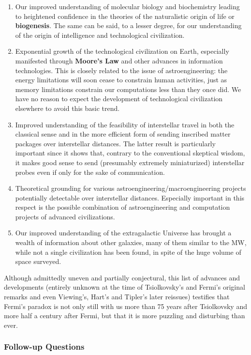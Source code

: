 \documentclass[a4paper,10pt]{article}
\begin{document}
\begin{enumerate}
    \item Our improved understanding of molecular biology and biochemistry leading to heightened confidence in the theories of the naturalistic origin of life or \textbf{biogenesis}. The same can be said, to a lesser degree, for our understanding of the origin of intelligence and technological civilization.
    \item Exponential growth of the technological civilization on Earth, especially manifested through \textbf{Moore's Law} and other advances in information technologies. This is closely related to the issue of astroengineering: the energy limitations will soon cease to constrain human activities, just as memory limitations constrain our computations less than they once did. We have no reason to expect the development of technological civilization elsewhere to avoid this basic trend.
    \item Improved understanding of the feasibility of interstellar travel in both the classical sense and in the more efficient form of sending inscribed matter packages over interstellar distances. The latter result is particularly important since it shows that, contrary to the conventional skeptical wisdom, it makes good sense to send (presumably extremely miniaturized) interstellar probes even if only for the sake of communication.
    \item Theoretical grounding for various astroengineering/macroengineering projects potentially detectable over interstellar distances. Especially important in this respect is the possible combination of astroengineering and computation projects of advanced civilizations.
    \item Our improved understanding of the extragalactic Universe has brought a wealth of information about other galaxies, many of them similar to the MW, while not a single civilization  has been found, in spite of the huge volume of space surveyed.
\end{enumerate}

{\noindent}Although admittedly uneven and partially conjectural, this list of advances and developments (entirely unknown at the time of Tsiolkovsky's and Fermi's original remarks and even Viewing's, Hart's and Tipler's later reissues) testifies that Fermi's paradox is not only still with us more than 75 years after Tsiolkovsky and more half a century after Fermi, but that it is more puzzling and disturbing than ever.

\subsubsection{Follow-up Questions}
\end{document}
